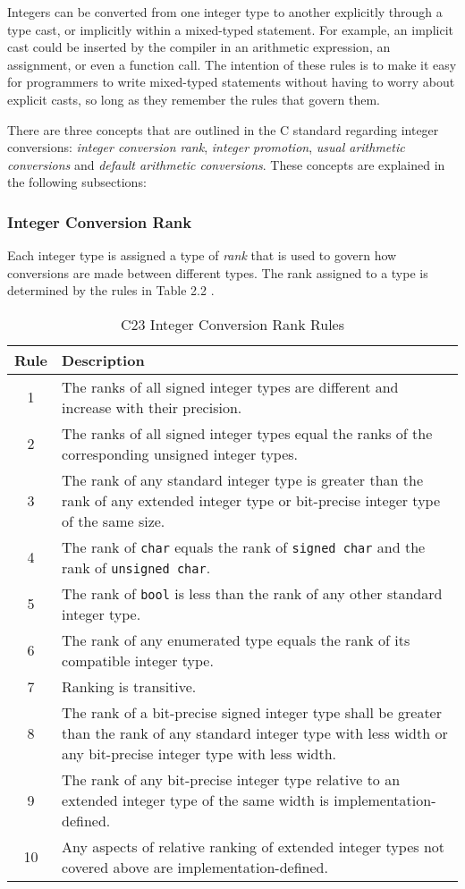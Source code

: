 Integers can be converted from one integer type to another explicitly through a type cast, or implicitly within a mixed-typed statement. For example, an implicit cast could be inserted by the compiler in an arithmetic expression, an assignment, or even a function call. The intention of these rules is to make it easy for programmers to write mixed-typed statements without having to worry about explicit casts, so long as they remember the rules that govern them.

There are three concepts that are outlined in the C standard regarding integer conversions: \textit{integer conversion rank}, \textit{integer promotion}, \textit{usual arithmetic conversions} and \textit{default arithmetic conversions}. These concepts are explained in the following subsections:

\subsubsection{Integer Conversion Rank}

Each integer type is assigned a type of \textit{rank} that is used to govern how conversions are made between different types. The rank assigned to a type is determined by the rules in Table 2.2 \cite{c_standard}.

\begin{table}[h!]
\centering
\begin{tabular}{|c|p{13cm}|}
\hline
\textbf{Rule} & \textbf{Description} \\
\hline
1 & The ranks of all signed integer types are different and increase with their precision.\\
\hline
2 & The ranks of all signed integer types equal the ranks of the corresponding unsigned integer types. \\
\hline
3 & The rank of any standard integer type is greater than the rank of any extended integer type or bit-precise integer type of the same size.\\
\hline
4 & The rank of \texttt{char} equals the rank of \texttt{signed char} and the rank of \texttt{unsigned char}. \\
\hline
5 & The rank of \texttt{bool} is less than the rank of any other standard integer type. \\
\hline
6 & The rank of any enumerated type equals the rank of its compatible integer type. \\
\hline
7 & Ranking is transitive.\\
\hline
8 & The rank of a bit-precise signed integer type shall be greater than the rank of any standard integer type with less width or any bit-precise integer type with less width. \\
\hline
9 & The rank of any bit-precise integer type relative to an extended integer type of the same width is implementation-defined. \\
\hline
10 & Any aspects of relative ranking of extended integer types not covered above are implementation-defined. \\
\hline
\end{tabular}
\caption{C23 Integer Conversion Rank Rules}
\end{table}

